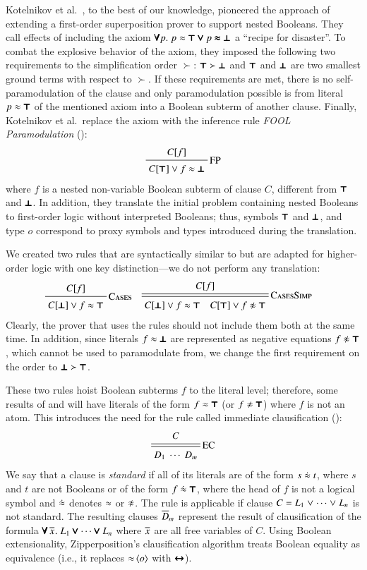 Kotelnikov et al.\ \cite{kotelnikov-15-fool}, to the best of our
knowledge, pioneered the approach of extending a first-order superposition prover to support
nested Booleans. They call effects of including the axiom $\pmb{\forall}
p. \; p \approx \pmb{\top} \pmb{\lor} p \pmb{\approx} \pmb{\bot}$ a  ``recipe for disaster''. To combat the
explosive behavior of the axiom, they imposed the following two requirements to
the simplification order $\succ$: $\pmb{\top} \succ \pmb{\bot}$ and
$\pmb{\top}$ and $\pmb{\bot}$ are two smallest ground terms with respect to $\succ$. If
these requirements are met, there is no self-paramodulation of the clause
and only paramodulation possible is from literal $p \approx \pmb{\top}$ of the mentioned axiom
into a Boolean subterm of another clause. Finally, Kotelnikov et al.\ replace
the axiom with the inference rule \emph{FOOL Paramodulation} ():
\pagebreak[2]
%
$$ \namedinference{FP}{C[f]}{C[\itrue] \vee f \eq \ifalse} $$
%
where $f$ is a nested non-variable Boolean subterm of clause $C$, different from
$\pmb{\top}$ and $\pmb{\bot}$. In addition, they translate the initial problem containing nested
Booleans  to first-order logic without interpreted Booleans; thus, symbols $\pmb{\top}$ and $\pmb{\bot}$, and type $o$
correspond to proxy symbols and types introduced during the translation. 

We created two rules that are syntactically similar to  but
are adapted for higher-order logic with one key distinction---we do not perform any translation:
%
\begin{align*}
  & \namedinference{Cases}{C[f]}{C[\ifalse] \vee f \eq \itrue}
  && \namedsimp{CasesSimp}{C[f]}{C[\ifalse] \vee f \eq \itrue \quad C[\itrue] \vee f \noteq \itrue}
\end{align*}
%
Clearly, the prover that uses the rules should not include them both at the same time.
In addition, since
literals $f \approx \pmb{\bot}$ are represented as negative equations $f \noteq \itrue$, which cannot be used to paramodulate from,
we change the first requirement on the order to $\pmb{\bot} \succ
\pmb{\top}$.

\newcommand{\eqneq}{\mathrel{\dot{\eq}}}
These two rules hoist Boolean subterms $f$ to the literal level; therefore,
some results of  and  will have literals of the form $f \approx \pmb{\top}$ (or
$f \noteq \itrue$) where $f$ is not an atom. This introduces the need for the rule
called immediate clausification ():
%
$$ \namedsimp{EC}{C}{D_1 \; \cdots \; D_m} $$
%
We say that a clause is \emph{standard} if all of its literals are of the form $s \eqneq t$,
where $s$ and $t$ are not Booleans or of the form $f \eqneq \itrue$, where the head of $f$
is not a logical symbol and $\eqneq$ denotes $\approx$ or $\not\approx$. The rule 
is applicable if clause $C = L_1 \mathrel\lor
\cdots \mathrel\lor L_n$ is not standard.
The resulting clauses $\overline{D}_{m}$ represent
the result of clausification of the formula $\pmb{\forall}\,\overline{x}_{}. \; L_1 \pmb{\lor}
\cdots \pmb{\lor} L_n$ where $\overline{x}_{}$ are all free variables of $C$.
Using Boolean extensionality, Zipperposition's clausification
algorithm treats Boolean equality as equivalence (i.e., it replaces
$\mathop{\approx}{\langle o\rangle}$ with $\pmb{\leftrightarrow}$).

